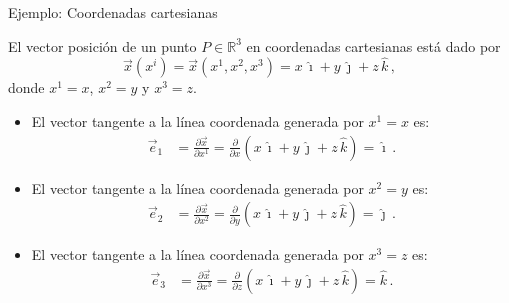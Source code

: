 \documentclass[../apunte_mecanica_clasica.tex]{subfiles}%
\begin{document}
\begin{apuntebloque}{Ejemplo: Coordenadas cartesianas}

El vector posición de un punto $P \in \mathbb{R}^3$ en coordenadas cartesianas está dado por
\begin{equation*}
\vec{x}(x^i)=\vec{x}(x^1, x^2, x^3) = x\,\hat{\imath} + y\,\hat{\jmath} + z\,\hat{k}\,,
\end{equation*}
donde $x^1 = x$, $x^2 = y$ y $x^3 = z$.

\begin{itemize}
  \item[i)] El vector tangente a la línea coordenada generada por $x^1 = x$ es:
  \begin{equation*}
  \begin{aligned}
  \vec{e}_1
  &= \frac{\partial \vec{x}}{\partial x^1}
  = \frac{\partial}{\partial x}\!\left(x\,\hat{\imath} + y\,\hat{\jmath} + z\,\hat{k}\right)
  = \hat{\imath}\,.
  \end{aligned}
  \end{equation*}

  \item[ii)] El vector tangente a la línea coordenada generada por $x^2 = y$ es:
  \begin{equation*}
  \begin{aligned}
  \vec{e}_2
  &= \frac{\partial \vec{x}}{\partial x^2}
  = \frac{\partial}{\partial y}\!\left(x\,\hat{\imath} + y\,\hat{\jmath} + z\,\hat{k}\right)
  = \hat{\jmath}\,.
  \end{aligned}
  \end{equation*}

  \item[iii)] El vector tangente a la línea coordenada generada por $x^3 = z$ es:
  \begin{equation*}
  \begin{aligned}
  \vec{e}_3
  &= \frac{\partial \vec{x}}{\partial x^3}
  = \frac{\partial}{\partial z}\!\left(x\,\hat{\imath} + y\,\hat{\jmath} + z\,\hat{k}\right)
  = \hat{k}\,.
  \end{aligned}
  \end{equation*}
\end{itemize}

\end{apuntebloque}
\end{document}
